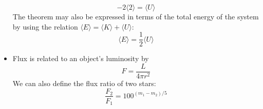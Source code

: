 \documentclass{book}
\begin{document}
\begin{itemize}
          \begin{equation*}
              -2 \langle 2 \rangle = \langle U \rangle \tag{C\&O 2.46}
          \end{equation*}
          The theorem may also be expressed in terms of the total energy of the system by using the relation $\langle E \rangle = \langle K \rangle + \langle U \rangle$:
          \begin{equation*}
              \langle E \rangle = \frac{1}{2} \langle U \rangle
          \end{equation*}
    \item Flux is related to an object's luminosity by
          \begin{equation*}
              F = \frac{L}{4 \pi r^2} \tag{C\&O 3.2}
          \end{equation*}
          We can also define the flux ratio of two stars:
          \begin{equation*}
              \frac{F_2}{F_1} = 100^{(m_1 - m_2)/5}
          \end{equation*}
\end{itemize}
\end{document}

